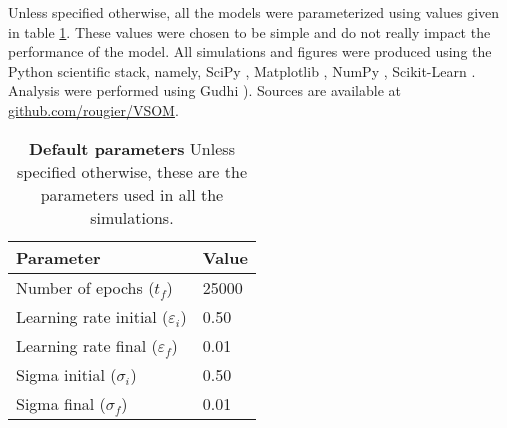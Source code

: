 Unless specified otherwise, all the models were parameterized using values given in table \ref{table:parameters}. These values were chosen to be simple and do not really impact the performance of the model. All simulations and figures were produced using the Python scientific stack, namely, SciPy \citep{Jones:2001}, Matplotlib \citep{Hunter:2007}, NumPy \citep{Walt:2011}, Scikit-Learn \citep{Pedregosa:2011}. Analysis were performed using Gudhi \citep{Maria:2014}). 
Sources are available at \href{https://github.com/rougier/VSOM}{github.com/rougier/VSOM}.
\begin{table}[!ht]
  \begin{center}
    \begin{tabular}{ll}
        \textbf{Parameter} & \textbf{Value} \\
        \hline
        Number of epochs      ($t_f$)           & 25000\\
        Learning rate initial ($\varepsilon_i$) & 0.50\\
        Learning rate final   ($\varepsilon_f$) & 0.01\\
        Sigma initial         ($\sigma_i$)      & 0.50\\
        Sigma final           ($\sigma_f$)      & 0.01\\
    \end{tabular}
      \caption{\textbf{Default parameters} Unless specified otherwise, these are
        the parameters used in all the simulations.}
      \label{table:parameters}
  \end{center}
\end{table}



